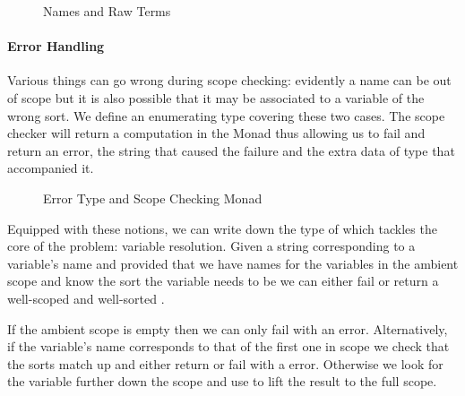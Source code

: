 \begin{figure}[h]
\begin{minipage}{0.35\textwidth}
\end{minipage}
\begin{minipage}{0.55\textwidth}
\end{minipage}
\caption{Names and Raw Terms}
\end{figure}

\paragraph{Error Handling} Various things can go wrong during scope checking:
evidently a name can be out of scope but it is also possible that it may be
associated to a variable of the wrong sort. We define an enumerating type
covering these two cases. The scope checker will return a computation in the
Monad  thus allowing us to fail and return an error, the string that
caused the failure and the extra data of type  that accompanied it.

\begin{figure}[h]
\begin{minipage}{0.5\textwidth}
\end{minipage}
\begin{minipage}{0.4\textwidth}
\end{minipage}
\caption{Error Type and Scope Checking Monad}\label{fig:scopemonad}
\end{figure}

Equipped with these notions, we can write down the type of 
which tackles the core of the problem: variable resolution. Given a string
corresponding to a variable's name and provided that we have names for the
variables in the ambient scope and know the sort the variable needs to be
we can either fail or return a well-scoped and well-sorted .

If the ambient scope is empty then we can only fail with an  error.
Alternatively, if the variable's name corresponds to that of the first one
in scope we check that the sorts match up and either return  or fail
with a  error. Otherwise we look for the variable further
down the scope and use  to lift the result to the full scope.

